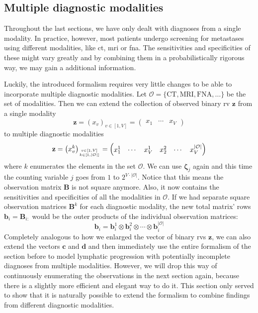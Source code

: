 \documentclass[../ms.tex]{subfiles}
\begin{document}
\subsection{Multiple diagnostic modalities}
\label{subsec:hmm_unilateral_multimod}

Throughout the last sections, we have only dealt with diagnoses from a single modality. In practice, however, most patients undergo screening for metastases using different modalities, like \gls{ct}, \gls{mri} or \gls{fna}. The sensitivities and specificities of these might vary greatly and by combining them in a probabilistically rigorous way, we may gain a additional information.

Luckily, the introduced formalism requires very little changes to be able to incorporate multiple diagnostic modalities. Let $\mathcal{O} = \{ \text{CT}, \text{MRI}, \text{FNA}, \ldots \}$ be the set of modalities. Then we can extend the collection of observed binary \gls{rv} $\mathbf{z}$ from a single modality
%
\begin{equation}
    \mathbf{z} = \left( x_v \right)_{v \in [1,V]} =
    \begin{pmatrix}
        x_1 & \cdots & x_V
    \end{pmatrix}
\end{equation}
%
to multiple diagnostic modalities
%
\begin{equation}
    \mathbf{z} = \left( x_v^k \right)_{v \in [1,V] \atop k \in [1, |\mathcal{O}|]} =
    \begin{pmatrix}
        x_1^1 & \cdots & x_V^1 & x_2^2 & \cdots & x_V^{|\mathcal{O}|}
    \end{pmatrix}
\end{equation}
%
where $k$ enumerates the elements in the set $\mathcal{O}$. We can use $\boldsymbol{\zeta}_j$ again and this time the counting variable $j$ goes from $1$ to $2^{V \cdot |\mathcal{O}|}$. Notice that this means the observation matrix $\mathbf{B}$ is not square anymore. Also, it now contains the sensitivities and specificities of all the modalities in $\mathcal{O}$. If we had separate square observation matrices $\mathbf{B}^k$ for each diagnostic modality, the new total matrix' rows $\mathbf{b}_i = \mathbf{B}_{i:}$ would be the outer products of the individual observation matrices:
%
\begin{equation}
    \mathbf{b}_i = \mathbf{b}_i^1 \otimes \mathbf{b}_i^2 \otimes \cdots \otimes \mathbf{b}_i^{|\mathcal{O}|}
\end{equation}
%
Completely analogous to how we enlarged the vector of binary \glspl{rv} $\mathbf{z}$, we can also extend the vectors $\mathbf{c}$ and $\mathbf{d}$ and then immediately use the entire formalism of the section before to model lymphatic progression with potentially incomplete diagnoses from multiple modalities. However, we will drop this way of continuously enumerating the observations in the next section again, because there is a slightly more efficient and elegant way to do it. This section only served to show that it is naturally possible to extend the formalism to combine findings from different diagnostic modalities.
\end{document}
